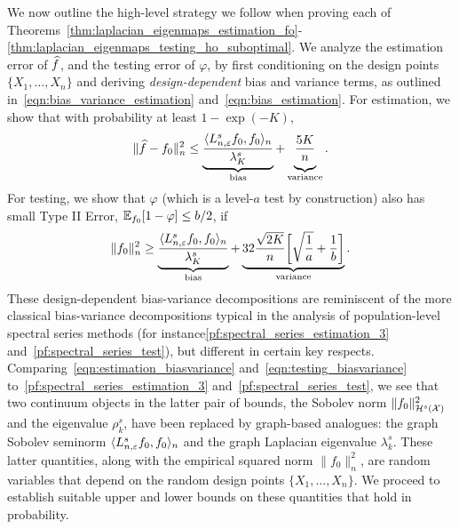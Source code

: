 We now outline the high-level strategy we follow when proving each of Theorems~\ref{thm:laplacian_eigenmaps_estimation_fo}-\ref{thm:laplacian_eigenmaps_testing_ho_suboptimal}. We analyze the estimation error of $\widehat{f}$, and the testing error of $\varphi$, by first conditioning on the design points $\{X_1,\ldots,X_n\}$ and deriving \emph{design-dependent} bias and variance terms, as outlined in~\eqref{eqn:bias_variance_estimation} and~\eqref{eqn:bias_estimation}. For estimation, we show that with probability at least $1 - \exp(-K)$,
\begin{equation}
\label{eqn:estimation_biasvariance}
\|\wh{f} - f_0\|_n^2 \leq \underbrace{\frac{\dotp{L_{n,\varepsilon}^s f_0}{f_0}_n}{\lambda_{K}^s}}_{\textrm{bias}} + \underbrace{\frac{5K}{n} \vphantom{\frac{\dotp{L^s f_0}{f_0}_n}{\lambda_{K}^s}}}_{\textrm{variance}}.
\end{equation}
For testing, we show that $\varphi$ (which is a level-$a$ test by construction) also has small Type II Error, $\mathbb{E}_{f_0}[1 - \varphi] \leq b/2$, if 
\begin{equation}
\label{eqn:testing_biasvariance}
\|f_0\|_n^2 \geq  \underbrace{\frac{\langle L_{n,\varepsilon}^s f_0, f_0 \rangle_n}{\lambda_{K}^s}}_{\textrm{bias}} + \underbrace{32\frac{\sqrt{2K}}{n}\biggl[\sqrt{\frac{1}{a}} + \frac{1}{b}\biggr]}_{\textrm{variance}}.
\end{equation}
These design-dependent bias-variance decompositions are reminiscent of the more classical bias-variance decompositions typical in the analysis of population-level spectral series methods (for instance\eqref{pf:spectral_series_estimation_3} and~\eqref{pf:spectral_series_test}), but different in certain key respects. Comparing~\eqref{eqn:estimation_biasvariance} and~\eqref{eqn:testing_biasvariance} to~\eqref{pf:spectral_series_estimation_3} and~\eqref{pf:spectral_series_test}, we see that two continuum objects in the latter pair of bounds, the Sobolev norm $\|f_0\|_{\mathcal{H}^s(\mathcal{X})}^2$ and the eigenvalue $\rho_k^s$, have been replaced by graph-based analogues: the graph Sobolev seminorm $\langle L_{n,\varepsilon}^sf_0, f_0 \rangle_n$ and the graph Laplacian eigenvalue $\lambda_k^s$. These latter quantities, along with the empirical squared norm $\|f_0\|_n^2$, are random variables that depend on the random design points $\{X_1,\ldots,X_n\}$. We proceed to establish suitable upper and lower bounds on these quantities that hold in probability. 

